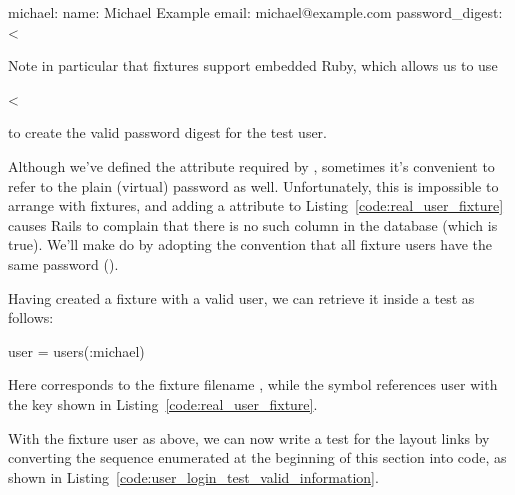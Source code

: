 \begin{codelisting}
\label{code:real_user_fixture}
\begin{code}
michael:
  name: Michael Example
  email: michael@example.com
  password_digest: <%
\end{code}
\end{codelisting}

\noindent Note in particular that fixtures support embedded Ruby, which allows us to use

\begin{code}
<%
\end{code}

\noindent to create the valid password digest for the test user.

Although we've defined the  attribute required by \linebreak {}, sometimes it's convenient to refer to the plain (virtual) password as well. Unfortunately, this is impossible to arrange with fixtures, and adding a  attribute to Listing~\ref{code:real_user_fixture} causes Rails to complain that there is no such column in the database (which is true). We'll make do by adopting the convention that all fixture users have the same password ().

Having created a fixture with a valid user, we can retrieve it inside a test as follows:

\begin{code}
user = users(:michael)
\end{code}

\noindent Here  corresponds to the fixture filename , while the symbol  references user with the key shown in Listing~\ref{code:real_user_fixture}.

With the fixture user as above, we can now write a test for the layout links by converting the sequence enumerated at the beginning of this section into code, as shown in Listing~\ref{code:user_login_test_valid_information}. 

